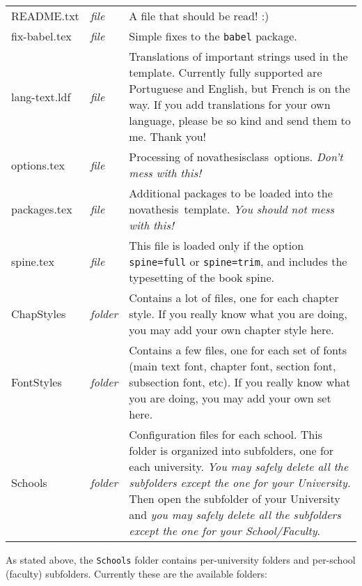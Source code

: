 \noindent
\bgroup
{}
\begin{tabularx}{\linewidth}{>{\ttfamily}l>{\itshape}l>{\upshape}X}
  README.txt    & file   &
  A file that should be read!  :)
  \\
  fix-babel.tex & file   &
  Simple fixes to the \texttt{babel} package.
  \\
  lang-text.ldf & file   &
  Translations of important strings used in the template.  Currently fully supported are Portuguese and English, but French is on the way.  If you add translations for your own language, please be so kind and send them to me. Thank you!
  \\
  options.tex   & file   &
  Processing of \gls{novathesisclass}\ options.  \emph{Don't mess with this!}
  \\
  packages.tex  & file   &
  Additional packages to be loaded into the \gls{novathesis}\ template. \emph{You should not mess with this!}
  \\
  spine.tex     & file   &
  This file is loaded only if the option \texttt{spine=full} or \texttt{spine=trim}, and includes the typesetting of the book spine.
  \\
  ChapStyles    & folder &
  Contains a lot of files, one for each chapter style.  If you really know what you are doing, you may add your own chapter style here.
  \\
  FontStyles    & folder &
  Contains a few files, one for each set of fonts (main text font, chapter font, section font, subsection font, etc).  If you really know what you are doing, you may add your own set here.
  \\
  Schools       & folder &
  Configuration files for each school.  This folder is organized into subfolders, one for each university.  \emph{You may safely delete all the subfolders except the one for your University.}  Then open the subfolder of your University and \emph{you may safely delete all the subfolders except the one for your School/Faculty}.
  \\
\end{tabularx}
\egroup

As stated above, the \texttt{Schools} folder contains per-university folders and per-school (faculty) subfolders.  Currently these are the available folders:

